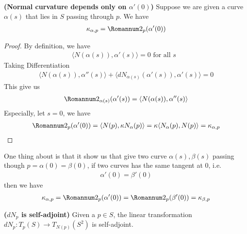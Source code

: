 \documentclass{report}
\begin{document}
\begin{theorem}
\label{Ncdo}
\textbf{(Normal curvature depends only on $\alpha '(0)$)} Suppose we are given a curve $\alpha (s)$  that lies in $S$ passing through $p$.  We have 
\begin{align*}
\kappa_{\alpha ,p }=\Sec_p(\alpha '(0))
\end{align*}
\end{theorem}
\begin{proof}
By definition, we have 
\begin{align*}
\langle N(\alpha (s)),\alpha '(s)\rangle =0\text{ for all $s$ }
\end{align*}
Taking Differentiation
\begin{align*}
\langle N(\alpha (s)),\alpha ''(s)\rangle + \langle dN_{\alpha (s)}(\alpha '(s)), \alpha '(s)\rangle =0 
\end{align*}
This give us 
\begin{align*}
\Sec_{\alpha (s)}(\alpha '(s))= \langle N(\alpha (s)),\alpha ''(s)\rangle 
\end{align*}
Especially, let $s=0$, we have 
\begin{align*}
\Sec_p(\alpha '(0))=\langle N(p),\kappa N_\alpha (p)\rangle = \kappa \langle N_\alpha (p),N(p)\rangle = \kappa_{\alpha,p }
\end{align*}
\end{proof}
\begin{mdframed}
One thing about  is that it show us that give two curve $\alpha (s),\beta (s)$ passing though $p=\alpha (0)=\beta (0)$, if two curves has the same tangent at $0$, i.e. 
 \begin{align*}
\alpha '(0)=\beta '(0)
\end{align*}
then we have 
\begin{align*}
\kappa_{\alpha ,p}=\Sec_p (\alpha '(0))=\Sec_p (\beta '(0))=\kappa_{\beta ,p}
\end{align*}
\end{mdframed}
\begin{theorem}
\textbf{($dN_p$ is self-adjoint)} Given a $p\in  S$, the linear transformation $dN_p:T_p(S)\rightarrow T_{N(p)}(S^2)$ is self-adjoint.
\end{theorem}
\end{document}
